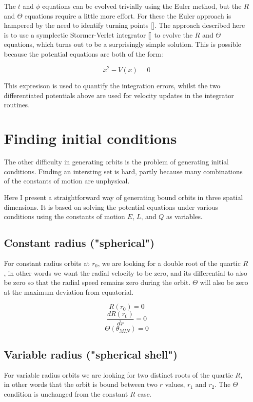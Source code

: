 \documentclass[11pt]{article}
\begin{document}
The $t$ and $\phi$ equations can be evolved trivially using the Euler method, but the $R$ and $\Theta$ equations require a little more effort.  For these the Euler approach is hampered by the need to identify turning points [].  The approach described here is to use a symplectic Stormer-Verlet integrator [] to evolve the $R$ and $\Theta$ equations, which turns out to be a surprisingly simple solution.  This is possible because the potential equations are both of the form:

$$
\dot x^2 - V(x) = 0
$$

This expresison is used to quantify the integration errors, whilst the two differentiated potentials above are used for velocity updates in the integrator routines.

\section{Finding initial conditions}

The other difficulty in generating orbits is the problem of generating initial conditions.  Finding an intersting set is hard, partly because many combinations of the constants of motion are unphysical.

Here I present a straightforward way of generating bound orbits in three spatial dimensions.  It is based on solving the potential equations under various conditions using the constants of motion $E$, $L$, and $Q$ as variables.

\subsection{Constant radius ("spherical")}

For constant radius orbits at $r_0$, we are looking for a double root of the quartic $R$, in other words we want the radial velocity to be zero, and its differential to also be zero so that the radial speed remains zero during the orbit.  $\Theta$ will also be zero at the maximum deviation from equatorial. 

$$
R(r_0) = 0
$$
$$
\frac{d R(r_0)}{d r} = 0
$$
$$
\Theta(\theta_{MIN}) = 0
$$

\subsection{Variable radius ("spherical shell")}

For variable radius orbits we are looking for two distinct roots of the quartic $R$, in other words that the orbit is bound between two $r$ values, $r_1$ and $r_2$.  The $\Theta$ condition is unchanged from the constant $R$ case.
\end{document}
